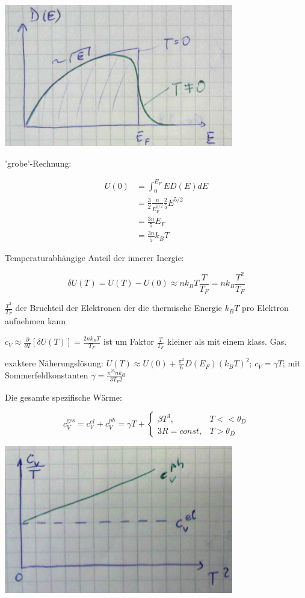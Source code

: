 \includegraphics[width=0.75\textwidth]{kap06_25.png}

'grobe'-Rechnung:

\begin{align}
U(0) &= \int_0^{E_F}ED(E)dE\\
&= \frac{3}{2}\frac{n}{E_F^{3/2}}\frac{2}{5}E^{5/2}\\
&=\frac{3n}{5}E_F\\
&=\frac{3n}{5}k_BT
\end{align}

Temperaturabhängige Anteil der innerer Inergie:

\[\delta U(T) = U(T)-U(0) \approx nk_BT\frac{T}{T_F} = nk_B \frac{T^2}{T_F}\]

\(\frac{T^2}{T_F}\) der Bruchteil der Elektronen der die thermische Energie \(k_BT\) pro Elektron aufnehmen kann

\(c_V \approx \frac{\partial}{\partial T}[\delta U(T)] = \frac{2nk_BT}{T_F}\) ist um Faktor \(\frac{T}{T_F}\) kleiner als mit einem klass. Gas.

exaktere Näherungslösung:  \(U(T) \approx U(0) +\frac{\pi^2}{6}D(E_F)(k_BT)^2\); \(c_V=\gamma T\); mit Sommerfeldkonstanten \(\gamma = \frac{\pi^23nk_B}{3T_F2}\)

Die gesamte spezifische Wärme:

\[c_V^{\text{ges}} = c_V^{el}+c_V^{ph} = \gamma T + \begin{cases}
 \beta T^3,  & T<<\theta_D\\
 3R=const,  & T>\theta_D
\end{cases}\]


\includegraphics[width=0.75\textwidth]{kap06_30.png}

